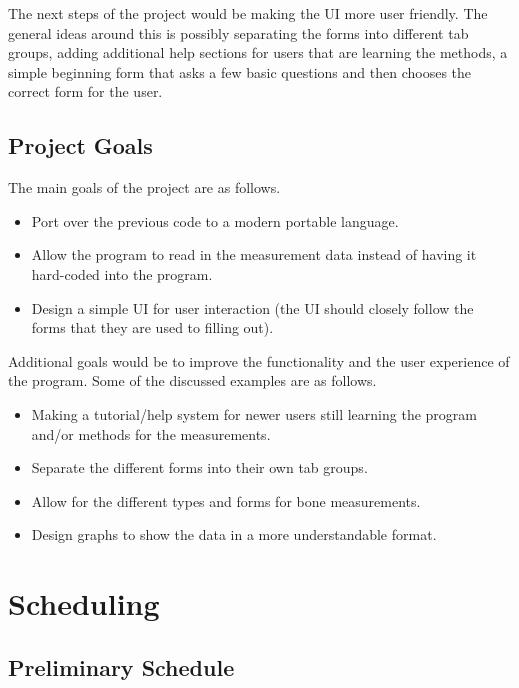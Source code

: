 \documentclass[12pt,letterpaper]{article}
\begin{document}
The next steps of the project would be making the UI more user friendly. The general ideas around this is possibly separating the forms into different tab groups, adding additional help sections for users that are learning the methods, a simple beginning form that asks a few basic questions and then chooses the correct form for the user.

\subsection{Project Goals}

The main goals of the project are as follows.

\begin{itemize}

\item Port over the previous code to a modern portable language.
\item Allow the program to read in the measurement data instead of having it hard-coded into the program.
\item Design a simple UI for user interaction (the UI should closely follow the forms that they are used to filling out).

\end{itemize}

Additional goals would be to improve the functionality and the user experience of the program. Some of the discussed examples are as follows.

\begin{itemize}

\item Making a tutorial/help system for newer users still learning the program and/or methods for the measurements.
\item Separate the different forms into their own tab groups.
\item Allow for the different types and forms for bone measurements.
\item Design graphs to show the data in a more understandable format.

\end{itemize}

\section{Scheduling}

\subsection{Preliminary Schedule}
\end{document}
